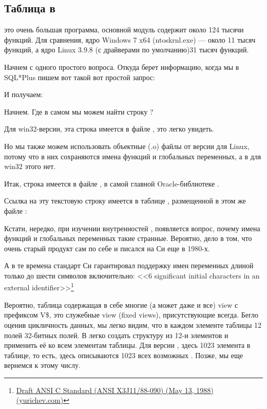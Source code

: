 \subsection{Таблица  в \oracle}

\myindex{\oracle}
 это очень большая программа, основной модуль  содержит около 124 тысячи функций. Для сравнения, ядро Windows 7 x64 (ntoskrnl.exe) --- около 11 тысяч функций, а ядро Linux 3.9.8 (с драйверами по умолчанию)\EMDASH{}31 тысяч функций.

Начнем с одного простого вопроса. Откуда \oracle берет информацию, когда мы в SQL*Plus пишем вот такой вот простой запрос:



И получаем:



Начнем. Где в самом \oracle мы можем найти строку ?

Для win32-версии, эта строка имеется в файле , это легко увидеть.

Но мы также можем использовать объектные (.o) файлы от версии \oracle для Linux, потому что в них сохраняются имена функций и глобальных переменных, а в  для win32 этого нет.

Итак, строка  имеется в файле , в самой главной Oracle-библиотеке .

Ссылка на эту текстовую строку имеется в таблице , размещенной в этом же файле :



Кстати, нередко, при изучении внутренностей \oracle, появляется вопрос, почему имена функций и глобальных переменных такие странные.
Вероятно, дело в том, что \oracle очень старый продукт сам по себе и писался на Си еще в 1980-х.

А в те времена стандарт Си гарантировал поддержку имен переменных длиной только до шести символов включительно:
<<6 significant initial characters in an external identifier>>\footnote{\href{http://go.yurichev.com/17142}{Draft ANSI C Standard (ANSI X3J11/88-090) (May 13, 1988) (yurichev.com)}}

Вероятно, таблица  содержащая в себе многие (а может даже и все) view с префиксом V\$, это служебные view (fixed views), присутствующие всегда.
Бегло оценив цикличность данных, мы легко видим, что в каждом элементе таблицы  12 полей 32-битных полей.
В \IDA легко создать структуру из 12-и элементов и применить её ко всем элементам таблицы.
Для версии , здесь 1023 элемента в таблице, то есть, здесь описываются 1023 всех возможных .
Позже, мы еще вернемся к этому числу.

